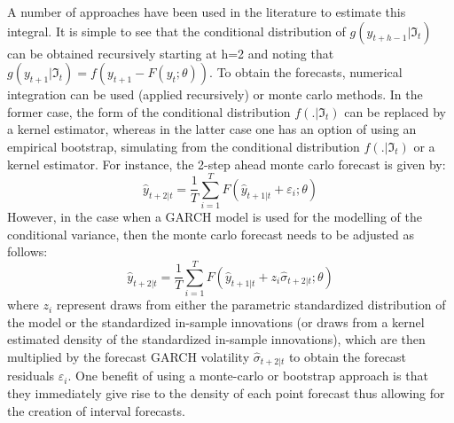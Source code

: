 A number of approaches have been used in the literature to estimate this
integral. It is simple to see that the conditional distribution of ${g\left(
{{y_{t + h - 1}}\left| {{\Im _t}} \right.} \right)}$ can be obtained recursively
starting at h=2 and noting that $g\left( {{y_{t + 1}}\left| {{\Im _t}} \right.}
\right) = f\left( {{y_{t + 1}} - F\left( {{y_t};\theta } \right)} \right)$. To
obtain the forecasts, numerical integration can be used (applied recursively) or
monte carlo methods. In the former case, the form of the conditional
distribution $f\left( {.\left| {{\Im _t}} \right.} \right)$ can be replaced by a
kernel estimator, whereas in the latter case one has an option of using an
empirical bootstrap, simulating from the conditional distribution $f\left(
{.\left| {{\Im _t}} \right.} \right)$ or a kernel estimator.  For instance,  
the 2-step ahead monte carlo forecast is given by:
\begin{equation}
{{\hat y}_{t + 2\left| t \right.}} = \frac{1}{T}\sum\limits_{i = 1}^T {F\left( {{{\hat y}_{t + 1\left| t \right.}} + {\varepsilon _i};\theta } \right)}
\end{equation}
However, in the case when a GARCH model is used for the modelling of the
conditional variance, then the monte carlo forecast needs to be adjusted as follows:
\begin{equation}
{{\hat y}_{t + 2\left| t \right.}} = \frac{1}{T}\sum\limits_{i = 1}^T {F\left( {{{\hat y}_{t + 1\left| t \right.}} + {z_i}{{\hat \sigma }_{t + 2\left| t \right.}};\theta } \right)}
\end{equation}
where $z_i$ represent draws from either the parametric standardized distribution
of the model  or the standardized in-sample innovations (or draws from a kernel
estimated density of the standardized in-sample innovations), which are then
multiplied  by the forecast GARCH volatility ${{{\hat \sigma }_{t + 2\left| t
\right.}}}$ to obtain the forecast residuals $\varepsilon_i$.
One benefit of using a monte-carlo or bootstrap approach is that they
immediately give rise to the density of each point forecast thus allowing for
the creation of interval forecasts.



